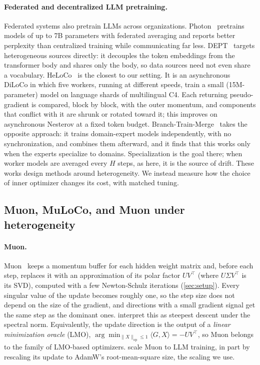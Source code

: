 \documentclass{article}
\begin{document}
\paragraph{Federated and decentralized LLM pretraining.} Federated systems also pretrain LLMs across organizations. Photon~\cite{sani2025photon} pretrains models of up to 7B parameters with federated averaging and reports better perplexity than centralized training while communicating far less. DEPT~\cite{iacob2025dept} targets heterogeneous sources directly: it decouples the token embeddings from the transformer body and shares only the body, so data sources need not even share a vocabulary. HeLoCo~\cite{alasif2026heloco} is the closest to our setting. It is an asynchronous DiLoCo in which five workers, running at different speeds, train a small (15M-parameter) model on language shards of multilingual C4. Each returning pseudo-gradient is compared, block by block, with the outer momentum, and components that conflict with it are shrunk or rotated toward it; this improves on asynchronous Nesterov at a fixed token budget. Branch-Train-Merge~\cite{li2022btm} takes the opposite approach: it trains domain-expert models independently, with no synchronization, and combines them afterward, and it finds that this works only when the experts specialize to domains. Specialization is the goal there; when worker models are averaged every $H$ steps, as here, it is the source of drift. These works design methods around heterogeneity. We instead measure how the choice of inner optimizer changes its cost, with matched tuning.

\subsection{Muon, MuLoCo, and Muon under heterogeneity}

\paragraph{Muon.} Muon~\cite{jordan2024muon} keeps a momentum buffer for each hidden weight matrix and, before each step, replaces it with an approximation of its polar factor $UV^\top$ (where $U\Sigma V^\top$ is its SVD), computed with a few Newton-Schulz iterations (\cref{sec:setup}). Every singular value of the update becomes roughly one, so the step size does not depend on the size of the gradient, and directions with a small gradient signal get the same step as the dominant ones. \citet{bernstein2024oldoptimizer} interpret this as steepest descent under the spectral norm. Equivalently, the update direction is the output of a \emph{linear minimization oracle} (LMO), $\arg\min_{\lVert X\rVert_{\mathrm{op}} \le 1} \langle G, X\rangle = -UV^\top$, so Muon belongs to the family of LMO-based optimizers. \citet{liu2025muonscalable} scale Muon to LLM training, in part by rescaling its update to AdamW's root-mean-square size, the scaling we use.
\end{document}
